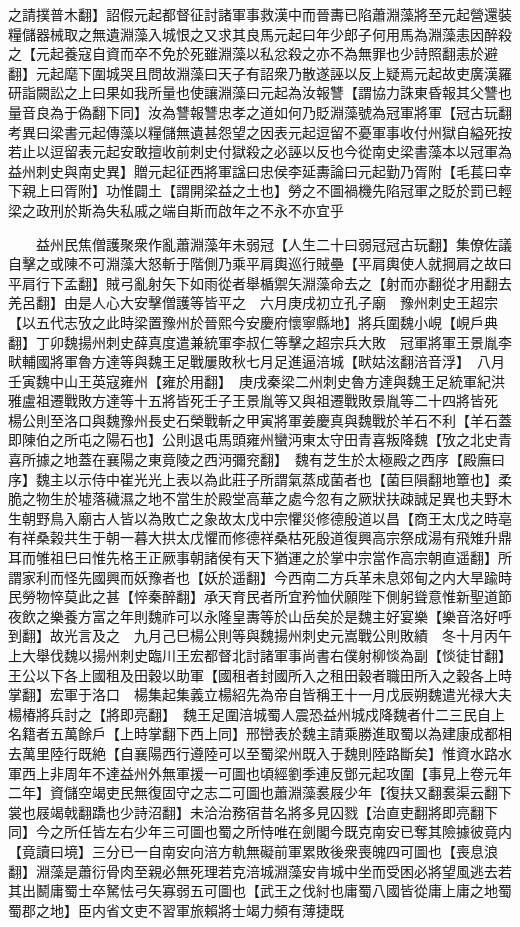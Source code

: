 之請撲普木翻】詔假元起都督征討諸軍事救漢中而晉夀已陷蕭淵藻將至元起營還裝糧儲器械取之無遺淵藻入城恨之又求其良馬元起曰年少郎子何用馬為淵藻恚因醉殺之【元起養寇自資而卒不免於死雖淵藻以私忿殺之亦不為無罪也少詩照翻恚於避翻】元起麾下圍城哭且問故淵藻曰天子有詔衆乃散遂誣以反上疑焉元起故吏廣漢羅研詣闕訟之上曰果如我所量也使讓淵藻曰元起為汝報讐【謂協力誅東昏報其父讐也量音良為于偽翻下同】汝為讐報讐忠孝之道如何乃貶淵藻號為冠軍將軍【冠古玩翻　考異曰梁書元起傳藻以糧儲無遺甚怨望之因表元起逗留不憂軍事收付州獄自縊死按若止以逗留表元起安敢擅收前刺史付獄殺之必誣以反也今從南史梁書藻本以冠軍為益州刺史與南史異】贈元起征西將軍諡曰忠侯李延夀論曰元起勤乃胥附【毛萇曰幸下親上曰胥附】功惟闢土【謂開梁益之土也】勞之不圖禍機先陷冠軍之貶於罰已輕梁之政刑於斯為失私戚之端自斯而啟年之不永不亦宜乎

　　益州民焦僧護聚衆作亂蕭淵藻年未弱冠【人生二十曰弱冠冠古玩翻】集僚佐議自擊之或陳不可淵藻大怒斬于階側乃乘平肩輿巡行賊壘【平肩輿使人就掆肩之故曰平肩行下孟翻】賊弓亂射矢下如雨從者舉楯禦矢淵藻命去之【射而亦翻從才用翻去羌呂翻】由是人心大安擊僧護等皆平之　六月庚戌初立孔子廟　豫州刺史王超宗【以五代志攷之此時梁置豫州於晉熙今安慶府懷寧縣地】將兵圍魏小峴【峴戶典翻】丁卯魏揚州刺史薛真度遣兼統軍李叔仁等擊之超宗兵大敗　冠軍將軍王景胤李畎輔國將軍魯方達等與魏王足戰屢敗秋七月足進逼涪城【畎姑泫翻涪音浮】　八月壬寅魏中山王英寇雍州【雍於用翻】　庚戌秦梁二州刺史魯方達與魏王足統軍紀洪雅盧祖遷戰敗方達等十五將皆死壬子王景胤等又與祖遷戰敗景胤等二十四將皆死　楊公則至洛口與魏豫州長史石榮戰斬之甲寅將軍姜慶真與魏戰於羊石不利【羊石蓋即陳伯之所屯之陽石也】公則退屯馬頭雍州蠻沔東太守田青喜叛降魏【攷之北史青喜所據之地蓋在襄陽之東竟陵之西沔彌兖翻】　魏有芝生於太極殿之西序【殿廡曰序】魏主以示侍中崔光光上表以為此莊子所謂氣蒸成菌者也【菌巨隕翻地簟也】柔脆之物生於墟落穢濕之地不當生於殿堂高華之處今忽有之厥狀扶疎誠足異也夫野木生朝野鳥入廟古人皆以為敗亡之象故太戊中宗懼災修德殷道以昌【商王太戊之時亳有祥桑榖共生于朝一暮大拱太戊懼而修德祥桑枯死殷道復興高宗祭成湯有飛雉升鼎耳而雊祖巳曰惟先格王正厥事朝諸侯有天下猶運之於掌中宗當作高宗朝直遥翻】所謂家利而怪先國興而妖豫者也【妖於遥翻】今西南二方兵革未息郊甸之内大旱踰時民勞物悴莫此之甚【悴秦醉翻】承天育民者所宜矜恤伏願陛下側躬聳意惟新聖道節夜飲之樂養方富之年則魏祚可以永隆皇夀等於山岳矣於是魏主好宴樂【樂音洛好呼到翻】故光言及之　九月己巳楊公則等與魏揚州刺史元嵩戰公則敗績　冬十月丙午上大舉伐魏以揚州刺史臨川王宏都督北討諸軍事尚書右僕射柳惔為副【惔徒甘翻】王公以下各上國租及田穀以助軍【國租者封國所入之租田穀者職田所入之穀各上時掌翻】宏軍于洛口　楊集起集義立楊紹先為帝自皆稱王十一月戊辰朔魏遣光禄大夫楊椿將兵討之【將即亮翻】　魏王足圍涪城蜀人震恐益州城戍降魏者什二三民自上名籍者五萬餘戶【上時掌翻下西上同】邢巒表於魏主請乘勝進取蜀以為建康成都相去萬里陸行既絶【自襄陽西行遵陸可以至蜀梁州既入于魏則陸路斷矣】惟資水路水軍西上非周年不達益州外無軍援一可圖也頃經劉季連反鄧元起攻圍【事見上卷元年二年】資儲空竭吏民無復固守之志二可圖也蕭淵藻裠屐少年【復扶又翻裠渠云翻下裳也屐竭戟翻蹻也少詩沼翻】未洽治務宿昔名將多見囚戮【治直吏翻將即亮翻下同】今之所任皆左右少年三可圖也蜀之所恃唯在劍閣今既克南安已奪其險據彼竟内【竟讀曰境】三分已一自南安向涪方軌無礙前軍累敗後衆喪魄四可圖也【喪息浪翻】淵藻是蕭衍骨肉至親必無死理若克涪城淵藻安肯城中坐而受困必將望風逃去若其出鬭庸蜀士卒駑怯弓矢寡弱五可圖也【武王之伐紂也庸蜀八國皆從庸上庸之地蜀蜀郡之地】臣内省文吏不習軍旅賴將士竭力頻有薄捷既